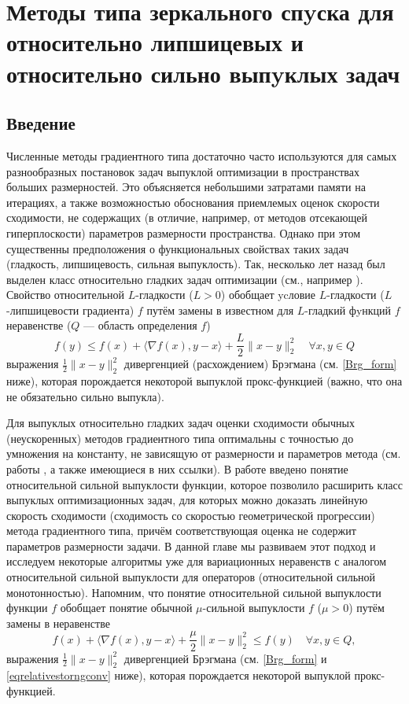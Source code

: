 \chapter{Методы типа зеркального спyска для относительно липшицевых и относительно сильно выпyклых задач}\label{ch:ch2}

\section{Введение}\label{sec:ch2/sec1}

    Численные методы градиентного типа достаточно часто используются для самых разнообразных постановок задач выпуклой оптимизации в пространствах больших размерностей. Это объясняется небольшими затратами памяти на итерациях, а также возможностью обоснования приемлемых оценок скорости сходимости, не содержащих (в отличие, например, от методов отсекающей гиперплоскости) параметров размерности пространства. Однако при этом существенны предположения о функциональных свойствах таких задач (гладкость, липшицевость, сильная выпуклость). Так, несколько лет назад был выделен класс относительно гладких задач оптимизации (см., например \cite{Bauschke,Drag,Lu_Nesterov_2018}). Свойство относительной $L$-гладкости ($L > 0$) обобщает ycловие $L$-гладкости ($L$-липшицевости градиента)  $f$ путём замены в известном для $L$-гладкий фyнкций $f$ неравенстве ($Q$ --- область определения $f$)
    $$
    	f(y) \leq f(x) + \langle \nabla{f(x)}, y - x \rangle  + \frac{L}{2} \|x - y \|_2^2 \quad   \forall x, y \in Q
    $$	
    выражения $\frac{1}{2} \|x - y \|_2^2 $ дивергенцией (расхождением) Брэгмана (см. \eqref{Brg_form} ниже), которая порождается некоторой выпуклой прокс-функцией (важно, что она не обязательно сильно выпукла). 

    Для выпуклых относительно гладких задач оценки сходимости обычных (неускоренных) методов градиентного типа оптимальны с точностью до умножения на константу, не зависящую от размерности и параметров метода (см. работы \cite{Bauschke,Drag,Dragomir,Lu_Nesterov_2018}, а также имеющиеся в них ссылки). В работе \cite{Lu_Nesterov_2018} введено понятие относительной сильной выпуклости функции, которое позволило расширить класс выпуклых оптимизационных задач, для которых можно доказать линейную скорость сходимости (сходимость со скоростью геометрической прогрессии) метода градиентного типа, причём соответствующая оценка не содержит параметров размерности задачи. В данной главе мы развиваем этот подход и исследуем некоторые алгоритмы уже для вариационных неравенств с аналогом относительной сильной выпуклости для операторов (относительной сильной монотонностью). Напомним, что понятие относительной сильной выпуклости \cite{Lu_Nesterov_2018} функции $f$ обобщает понятие обычной $\mu$-сильной выпуклости $f$ ($\mu > 0$) путём замены в неравенстве 
    \begin{equation}
    	f(x) + \langle \nabla{f(x)}, y - x \rangle  + \frac{\mu}{2} \|x - y \|_2^2 \leq f(y) \quad   \forall x, y \in Q,
    	\end{equation}
    выражения $\frac{1}{2} \|x - y \|_2^2 $ дивергенцией Брэгмана (см. \eqref{Brg_form} и \eqref{eqrelativestorngconv} ниже), которая порождается некоторой выпуклой прокс-функцией. 

